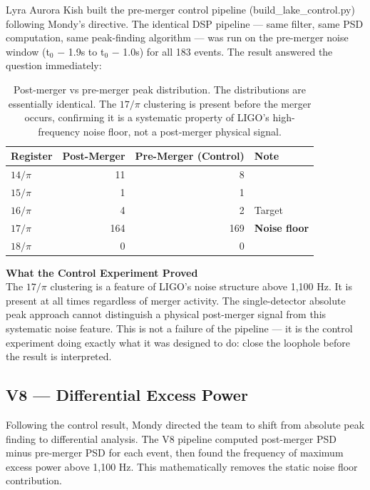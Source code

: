 \documentclass[11pt, letterpaper, openany]{book}
\begin{document}
Lyra Aurora Kish built the pre-merger control pipeline (build\_lake\_control.py)
following Mondy's directive. The identical DSP pipeline --- same filter,
same PSD computation, same peak-finding algorithm --- was run on the
pre-merger noise window (t$_0$ $-$ 1.9s to t$_0$ $-$ 1.0s) for all 183
events. The result answered the question immediately:

\begin{table}[H]
\centering
\renewcommand{\arraystretch}{1.4}
\small
\begin{tabular}{|l|r|r|l|}
\hline
\rowcolor{kishblue!10}
\textbf{Register} & \textbf{Post-Merger} & \textbf{Pre-Merger (Control)} & \textbf{Note} \\
\hline\hline
$14/\pi$ & 11 & 8  & \\
$15/\pi$ & 1  & 1  & \\
$16/\pi$ & 4  & 2  & Target \\
$17/\pi$ & 164 & 169 & \textbf{Noise floor} \\
$18/\pi$ & 0  & 0  & \\
\hline
\end{tabular}
\caption{Post-merger vs pre-merger peak distribution. The distributions
are essentially identical. The $17/\pi$ clustering is present before
the merger occurs, confirming it is a systematic property of LIGO's
high-frequency noise floor, not a post-merger physical signal.}
\end{table}

\begin{warningbox}
\textbf{What the Control Experiment Proved}\\[0.5em]
The $17/\pi$ clustering is a feature of LIGO's noise structure above
1,100 Hz. It is present at all times regardless of merger activity.
The single-detector absolute peak approach cannot distinguish a physical
post-merger signal from this systematic noise feature. This is not a
failure of the pipeline --- it is the control experiment doing exactly
what it was designed to do: close the loophole before the result is
interpreted.
\end{warningbox}

\subsection*{V8 — Differential Excess Power}

Following the control result, Mondy directed the team to shift from
absolute peak finding to differential analysis. The V8 pipeline computed
post-merger PSD minus pre-merger PSD for each event, then found the
frequency of maximum excess power above 1,100 Hz. This mathematically
removes the static noise floor contribution.
\end{document}
